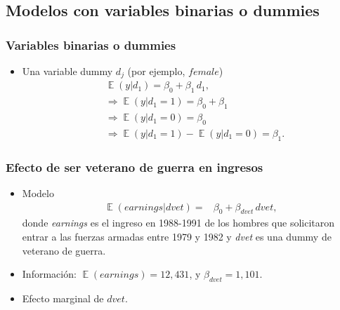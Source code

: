 \documentclass[t, compress, spanish, aspectratio=169]{beamer}
\DeclareMathOperator{\E}{\mathbb{E}}
\begin{document}
    \subsection*{Modelos con variables binarias o dummies}
    \begin{frame}
        \frametitle{Variables binarias o dummies}
        \begin{itemize}
            \item Una variable dummy $d_j$ (por ejemplo, $female$)
            \begin{align*}
            		&\E(y|d_1)=\beta_0 + \beta_1 \, d_1, \\
            		&\Rightarrow \E(y|d_1\!=\!1)=\beta_0+\beta_1 \\
            		&\Rightarrow \E(y|d_1\!=\!0) = \beta_0\\
            		&\Rightarrow \E(y|d_1\!=\!1)-\E(y|d_1\!=\!0) = \beta_1.
            \end{align*}
        \end{itemize}
    \end{frame}
    
    \begin{frame}
    		\frametitle{Efecto de ser veterano de guerra en ingresos}
    		\begin{itemize}
    			\item  Modelo
    			\begin{align*}
    				\E(earnings|dvet) =& \beta_0 +\beta_{dvet} \,dvet ,
    			\end{align*}
    			donde \emph{earnings} es el ingreso en 1988-1991 de los hombres que solicitaron entrar a las fuerzas armadas entre 1979 y 1982 y \emph{dvet} es una dummy de veterano de guerra.
    			\item Informaci\'on: $\E(earnings)=12{,}431$, y $\beta_{dvet}=1{,}101$.
    			\item Efecto marginal de $dvet$.
    		\end{itemize}
    \end{frame}
    
%    
    
\end{document}
